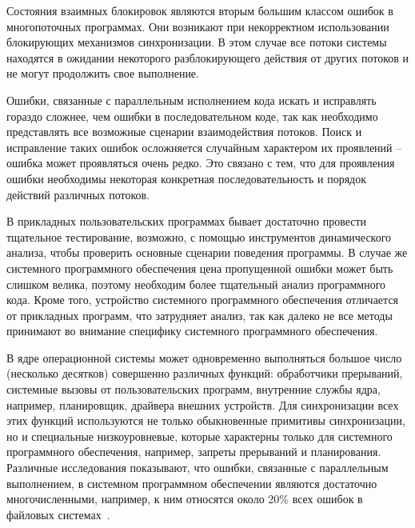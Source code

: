 Состояния взаимных блокировок являются вторым большим классом ошибок в многопоточных программах.
Они возникают при некорректном использовании блокирующих механизмов синхронизации.
В этом случае все потоки системы находятся в ожидании некоторого разблокирующего действия от других потоков и не могут продолжить свое выполнение. 

Ошибки, связанные с параллельным исполнением кода искать и исправлять гораздо сложнее, чем ошибки в последовательном коде, так как необходимо представлять все возможные сценарии взаимодействия потоков.
Поиск и исправление таких ошибок осложняется случайным характером их проявлений -- ошибка может проявляться очень редко.
Это связано с тем, что для проявления ошибки необходимы некоторая конкретная последовательность и порядок действий различных потоков. 

В прикладных пользовательских программах бывает достаточно провести тщательное тестирование, возможно, с помощью инструментов динамического анализа, чтобы проверить основные сценарии поведения программы.
В случае же системного программного обеспечения цена пропущенной ошибки может быть слишком велика, поэтому необходим более тщательный анализ программного кода.
Кроме того, устройство системного программного обеспечения отличается от прикладных программ, что затрудняет анализ, так как далеко не все методы принимают во внимание специфику системного программного обеспечения.

В ядре операционной системы может одновременно выполняться большое число (несколько десятков) совершенно различных функций: обработчики прерываний, системные вызовы от пользовательских программ, внутренние службы ядра, например, планировщик, драйвера внешних устройств.
Для синхронизации всех этих функций используются не только обыкновенные примитивы синхронизации, но и специальные низкоуровневые, которые характерны только для системного программного обеспечения, например, запреты прерываний и планирования. 
Различные исследования показывают, что ошибки, связанные с параллельным выполнением, в системном программном обеспечении являются достаточно многочисленными, например, к ним относятся около 20\% всех ошибок в файловых
системах~.

